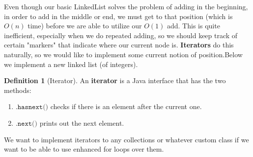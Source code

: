 \documentclass{article}
\theoremstyle{definition}
\theoremstyle{remark}
\theoremstyle{definition}
\newtheorem{definition}{Definition}[section]
\begin{document}
Even though our basic LinkedList solves the problem of adding in the beginning, in order to add in the middle or end, we must get to that position (which is $O(n)$ time) before we are able to utilize our $O(1)$ add. This is quite inefficient, especially when we do repeated adding, so we should keep track of certain "markers" that indicate where our current node is. \textbf{Iterators} do this naturally, so we would like to implement some current notion of position.Below we implement a new linked list (of integers). 

\begin{definition}[Iterator]
An \textbf{iterator} is a Java interface that has the two methods: 
\begin{enumerate}
    \item $\texttt{.hasnext()}$ checks if there is an element after the current one. 
    \item $\texttt{.next()}$ prints out the next element. 
\end{enumerate}
We want to implement iterators to any collections or whatever custom class if we want to be able to use enhanced for loops over them. 
\end{definition}
\end{document}
